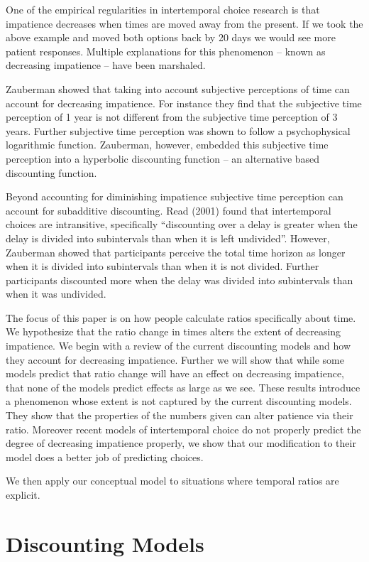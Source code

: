 \documentclass[]{article}
\begin{document}
One of the empirical regularities in intertemporal choice research is that impatience decreases when times are moved away from the present.
If we took the above example and moved both options back by 20 days we would see more patient responses. 
Multiple explanations for this phenomenon -- known as decreasing impatience -- have been marshaled. 

Zauberman showed that taking into account subjective perceptions of time can account for decreasing impatience. 
For instance they find that the subjective time perception of 1 year is not different from the subjective time perception of 3 years. 
Further subjective time perception was shown to follow a psychophysical logarithmic function. Zauberman, however, embedded this subjective time perception into a hyperbolic discounting function – an alternative based discounting function.  

Beyond accounting for diminishing impatience subjective time perception can account for subadditive discounting. 
Read (2001) found that intertemporal choices are intransitive, specifically “discounting over a delay is greater when the delay is divided into subintervals than when it is left undivided”. 
However, Zauberman showed that participants perceive the total time horizon as longer when it is divided into subintervals than when it is not divided. 
Further participants discounted more when the delay was divided into subintervals than when it was undivided. 

The focus of this paper is on how people calculate ratios specifically about time. 
We hypothesize that the ratio change in times alters the extent of decreasing impatience. 
We begin with a review of the current discounting models and how they account for decreasing impatience. 
Further we will show that while some models predict that ratio change will have an effect on decreasing impatience, that none of the models predict effects as large as we see. 
These results introduce a phenomenon whose extent is not captured by the current discounting models. 
They show that the properties of the numbers given can alter patience via their ratio. 
Moreover recent models of intertemporal choice do not properly predict the degree of decreasing impatience properly, we show that our modification to their model does a better job of predicting choices. 

We then apply our conceptual model to situations where temporal ratios are explicit. 


\section{Discounting Models}
\end{document}
